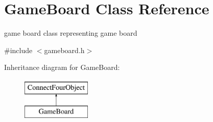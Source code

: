 \hypertarget{classGameBoard}{\section{\-Game\-Board \-Class \-Reference}
\label{classGameBoard}
}


game board class representing game board  




{\ttfamily \#include $<$gameboard.\-h$>$}

\-Inheritance diagram for \-Game\-Board\-:\begin{figure}[H]
\begin{center}
\leavevmode
\includegraphics[height=2.000000cm]{classGameBoard}
\end{center}
\end{figure}
